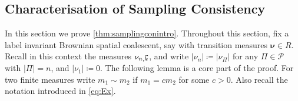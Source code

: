 \documentclass[reqno,draft]{amsart}
\numberwithin{equation}{section}
\theoremstyle{plain}
\theoremstyle{remark}
\renewcommand{\P}{\mathbb{P}} %
\newcommand*\diff{\mathop{}\!\mathrm{d}}
\newcommand{\fpart}{\Pi} %
\newcommand{\nurates}{R} %
\newcommand{\kbr}{K} %
\newcommand{\nut}[1]{|\nu_{#1}|}
\newcommand{\nunk}{\nu_{n,\smash{\vec{k}}}}
\begin{document}
%

\subsection{Characterisation of Sampling Consistency}\label{sec:samplingcon}

In this section we prove \cref{thm:samplingconintro}. Throughout this section, fix a label invariant Brownian spatial coalescent, say with transition measures $\boldsymbol \nu \in \nurates$. Recall in this context the measures $\nunk$, and write $\nut{n} \coloneqq \nut{\fpart}$ for any $\fpart\in \mathcal{P}$ with $|\fpart| = n$, and $\nut{1} \coloneqq 0$.
The following lemma is a core part of the proof. For two finite measures write $m_1\sim m_2$ if $m_1 = c m_2$ for some $c > 0$. %
Also recall the notation introduced in \eqref{eq:Ex}.
\end{document}
